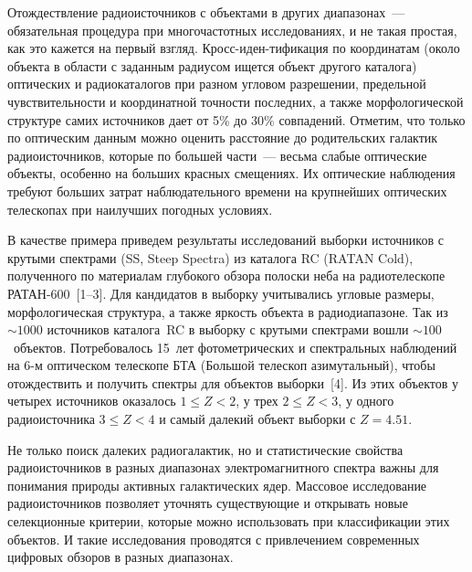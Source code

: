 \begin{multicols}{2}
      Отождествление радиоисточников с объектами в других диапазонах~--- обязательная 
процедура при многочастотных исследованиях, и не такая прос\-тая, как это кажется на 
первый взгляд. Кросс-иден-\linebreak ти\-фи\-ка\-ция по координатам (около объекта в обла\-сти с 
заданным радиусом ищется объект другого каталога) оптических и радиокаталогов при 
разном угловом разрешении, предельной чув\-ст\-ви\-тель\-ности и координатной точности 
последних, а также морфологической структуре самих источников дает от 5\% до 30\% 
совпадений. Отметим, что только по оптическим данным можно оценить расстояние до 
родительских галактик радиоисточников, которые по большей час\-ти~--- весь\-ма слабые 
оптические объекты, особенно на больших красных смещениях. Их оптические наблюдения 
требуют больших затрат наблюдательного времени на крупнейших оптических телескопах 
при наилучших погодных условиях.
      
      В качестве примера приведем результаты исследований выборки источников с 
крутыми спектрами (SS, {Steep Spectra}) из каталога RC ({RATAN Cold}), 
полученного по материалам глубокого обзора полоски неба на радиотелескопе 
      РАТАН-600~[1--3]. Для кандидатов в выборку учитывались угловые размеры, 
морфологическая структура, а также яркость объекта в радиодиапазоне. Так из $\sim1000$ 
источников каталога~RC в выборку с крутыми спектрами вошли $\sim100$~объектов. 
Потребовалось 15~лет фотометрических и спектральных наблюдений на 6-м оптическом 
телескопе БТА (Большой телескоп азимутальный), чтобы отождествить и получить спектры 
для объектов выборки~[4]. Из этих объектов у четырех источников оказалось $1 \leq Z<2$, у 
трех $2\leq Z<3$, у одного радиоисточника $3\leq Z< 4$ и самый далекий объект выборки с 
$Z=4.51$. 
      
      Не только поиск далеких радиогалактик, но и статистические свойства 
радиоисточников в разных диапазонах электромагнитного спектра важны для понимания 
природы активных галактических ядер. Массовое исследование радиоисточников позволяет 
уточнять существующие и открывать новые селекционные критерии, которые можно 
использовать при классификации этих объектов. И такие исследования проводятся с 
привлечением современных цифровых обзоров в разных диапазонах. 
      

\end{multicols}
